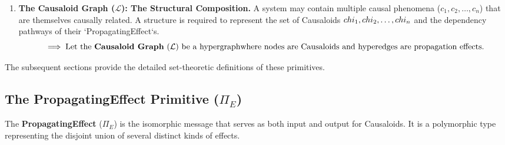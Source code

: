 \begin{enumerate}
    \item \textbf{The Causaloid Graph ($\mathcal{L}$): The Structural Composition.}\newline
    A system may contain multiple causal phenomena ($c_1, c_2, \dots, c_n$) that are themselves causally related.
     A structure is required to represent the set of Causaloids {$\\chi_1, \\chi_2, \dots, \\chi_n$} and the dependency pathways of their `PropagatingEffect`s.
    \begin{equation*}
        \implies \text{Let the \textbf{Causaloid Graph} ($\mathcal{L}$) be a hypergraph\newline
         where nodes are Causaloids and hyperedges are propagation effects.}
    \end{equation*}

\end{enumerate}

\noindent The subsequent sections provide the detailed set-theoretic definitions of these primitives.

\subsection{The PropagatingEffect Primitive (\(\Pi_E\))}
\label{sec:propagating_effect_formal}

The \textbf{PropagatingEffect} (\(\Pi_E\)) is the isomorphic message that serves as both input and output for Causaloids. 
It is a polymorphic type representing the disjoint union of several distinct kinds of effects.\newline

